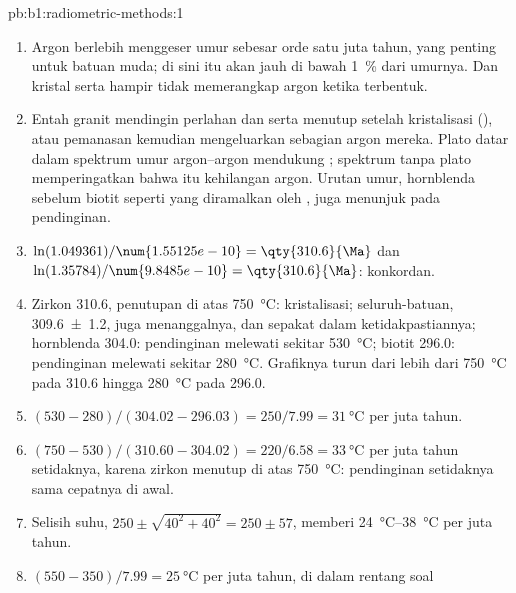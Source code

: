 \begin{solution}{pb:b1:radiometric-methods:1}
\begin{enumerate}
  \item Argon berlebih menggeser umur sebesar orde satu juta tahun, yang penting untuk batuan
        muda; di sini itu akan jauh di bawah \qty{1}{\percent} dari umurnya. Dan kristal 
        serta  hampir tidak memerangkap argon ketika terbentuk.
  \item Entah granit mendingin perlahan dan  serta  menutup setelah
        kristalisasi (), atau pemanasan kemudian mengeluarkan sebagian argon
        mereka. Plato datar dalam spektrum umur argon--argon mendukung ;
        spektrum tanpa plato memperingatkan bahwa  itu kehilangan argon. Urutan
        umur, hornblenda sebelum biotit seperti yang diramalkan oleh , juga
        menunjuk pada pendinginan.
  \item $\ln(1.049361)/\num{1.55125e-10} = \qty{310.6}{\Ma}$ dan
        $\ln(1.35784)/\num{9.8485e-10} = \qty{310.6}{\Ma}$: konkordan.
  \item Zirkon \qty{310.6}{\Ma}, penutupan di atas \qty{750}{\celsius}: kristalisasi;
         seluruh-batuan, \qty[uncertainty-mode=separate]{309.6(12)}{\Ma}, juga
        menanggalnya, dan sepakat dalam ketidakpastiannya; hornblenda \qty{304.0}{\Ma}:
        pendinginan melewati sekitar \qty{530}{\celsius}; biotit \qty{296.0}{\Ma}: pendinginan
        melewati sekitar \qty{280}{\celsius}. Grafiknya turun dari lebih dari
        \qty{750}{\celsius} pada \qty{310.6}{\Ma} hingga \qty{280}{\celsius} pada
        \qty{296.0}{\Ma}.
  \item $(530 - 280)/(304.02 - 296.03) = 250/7.99 = \qty{31}{\celsius}$ per juta
        tahun.
  \item $(750 - 530)/(310.60 - 304.02) = 220/6.58 = \qty{33}{\celsius}$ per juta tahun
        setidaknya, karena zirkon menutup di atas \qty{750}{\celsius}: pendinginan setidaknya
        sama cepatnya di awal.
  \item Selisih suhu, $250 \pm \sqrt{40^2 + 40^2} = 250 \pm
        57$, memberi \qtyrange{24}{38}{\celsius} per juta tahun.
  \item $(550 - 350)/7.99 = \qty{25}{\celsius}$ per juta tahun, di dalam rentang soal

\end{enumerate}
\end{solution}
